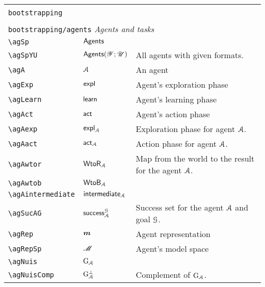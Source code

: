 \begin{longtable}{lll}
 &  & \\ 
 \multicolumn{3}{l}{{\color[rgb]{0.5,0.5,0.5}\texttt{bootstrapping}} \emph{}}\\ 
 \hline
\hline
 &  & \\ 
 \multicolumn{3}{l}{{\color[rgb]{0.5,0.5,0.5}\texttt{bootstrapping/agents}} \emph{Agents and tasks}}\\ 
 \hline
{\color[rgb]{0.5,0.5,0.5}\texttt{\textbackslash agSp}} & $\mathsf{Agents}$ &  \\ 
 {\color[rgb]{0.5,0.5,0.5}\texttt{\textbackslash agSpYU}} & $\mathsf{Agents}(\mathscr{Y};\mathscr{U})$ &  All agents with given formats.\\ 
 {\color[rgb]{0.5,0.5,0.5}\texttt{\textbackslash agA}} & $\mathcal{A}$ &  An agent\\ 
 {\color[rgb]{0.5,0.5,0.5}\texttt{\textbackslash agExp}} & $\mathsf{expl}$ &  Agent's exploration phase\\ 
 {\color[rgb]{0.5,0.5,0.5}\texttt{\textbackslash agLearn}} & $\mathsf{learn}$ &  Agent's learning phase\\ 
 {\color[rgb]{0.5,0.5,0.5}\texttt{\textbackslash agAct}} & $\mathsf{act}$ &  Agent's action phase\\ 
 {\color[rgb]{0.5,0.5,0.5}\texttt{\textbackslash agAexp}} & $\mathsf{expl}_{\mathcal{A}}$ &  Exploration phase for agent $\mathcal{A}$.\\ 
 {\color[rgb]{0.5,0.5,0.5}\texttt{\textbackslash agAact}} & $\mathsf{act}_{\mathcal{A}}$ &   Action phase for agent $\mathcal{A}$.\\ 
 {\color[rgb]{0.5,0.5,0.5}\texttt{\textbackslash agAwtor}} & $\mathsf{WtoR}_{\mathcal{A}}$ &  Map from the world to the result for the agent $\mathcal{A}$.\\ 
 {\color[rgb]{0.5,0.5,0.5}\texttt{\textbackslash agAwtob}} & $\mathsf{WtoB}_{\mathcal{A}}$ &  \\ 
 {\color[rgb]{0.5,0.5,0.5}\texttt{\textbackslash agAintermediate}} & $\mathsf{intermediate}_{\mathcal{A}}$ & \\ 
 {\color[rgb]{0.5,0.5,0.5}\texttt{\textbackslash agSucAG}} & $\mathsf{success}^{\mathcal{G}}_{\mathcal{A}}$ &  Success set for the agent $\mathcal{A}$ and goal $\mathcal{G}$.\\ 
 {\color[rgb]{0.5,0.5,0.5}\texttt{\textbackslash agRep}} & $\boldsymbol{m}$ &  Agent representation\\ 
 {\color[rgb]{0.5,0.5,0.5}\texttt{\textbackslash agRepSp}} & $\mathscr{M}$ &  Agent's model space\\ 
 {\color[rgb]{0.5,0.5,0.5}\texttt{\textbackslash agNuis}} & $\mathrm{G}_{\mathcal{A}}$ & \\ 
 {\color[rgb]{0.5,0.5,0.5}\texttt{\textbackslash agNuisComp}} & $\mathrm{G}_{\mathcal{A}}^{\perp}$ &  Complement of $\mathrm{G}_{\mathcal{A}}$.\\ 

\end{longtable}
